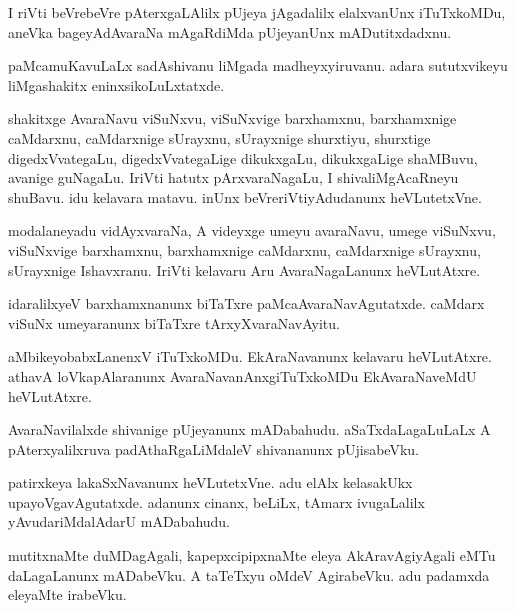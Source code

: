 \documentclass{article}
\begin{document}
\begin{mn}
I riVti  beVrebeVre  pAterxgaLAlilx  pUjeya  jAgadalilx  elalxvanUnx  iTuTxkoMDu,  aneVka  
bageyAdAvaraNa mAgaRdiMda  pUjeyanUnx  mADutitxdadxnu.
\end{mn}

\begin{mn}
paMcamuKavuLaLx  sadAshivanu  liMgada  madheyxyiruvanu.  adara sututxvikeyu  liMgashakitx  eninxsikoLuLxtatxde.
\end{mn}

\begin{mn}
shakitxge  AvaraNavu  viSuNxvu,  viSuNxvige  barxhamxnu,  barxhamxnige  caMdarxnu,  caMdarxnige  sUrayxnu,  
sUrayxnige  shurxtiyu,  shurxtige  digedxVvategaLu,  digedxVvategaLige  dikukxgaLu,  dikukxgaLige  shaMBuvu,  
avanige  guNagaLu.  IriVti  hatutx  pArxvaraNagaLu,  I  shivaliMgAcaRneyu  shuBavu.  idu  kelavara  matavu.  
inUnx  beVreriVtiyAdudanunx  heVLutetxVne.
\end{mn}

\begin{mn}
modalaneyadu  vidAyxvaraNa,  A  videyxge  umeyu  avaraNavu,  umege  viSuNxvu,  viSuNxvige  barxhamxnu, 
barxhamxnige  caMdarxnu,  caMdarxnige  sUrayxnu,  sUrayxnige  Ishavxranu.  IriVti  kelavaru  Aru  
AvaraNagaLanunx  heVLutAtxre.
\end{mn}

\begin{mn}
idaralilxyeV  barxhamxnanunx  biTaTxre  paMcaAvaraNavAgutatxde.  caMdarx  viSuNx  umeyaranunx  
biTaTxre  tArxyXvaraNavAyitu.
\end{mn}

\begin{mn}
aMbikeyobabxLanenxV  iTuTxkoMDu.  EkAraNavanunx  kelavaru  heVLutAtxre.  athavA  loVkapAlaranunx  
AvaraNavanAnxgiTuTxkoMDu  EkAvaraNaveMdU  heVLutAtxre.
\end{mn}

\begin{mn}
AvaraNavilalxde  shivanige  pUjeyanunx  mADabahudu.  aSaTxdaLagaLuLaLx  A  pAterxyalilxruva  
padAthaRgaLiMdaleV  shivananunx  pUjisabeVku.
\end{mn}

\begin{mn}
patirxkeya  lakaSxNavanunx  heVLutetxVne.  adu  elAlx  kelasakUkx  upayoVgavAgutatxde.  adanunx  
cinanx,  beLiLx,  tAmarx  ivugaLalilx  yAvudariMdalAdarU  mADabahudu.
\end{mn}

\begin{mn}
mutitxnaMte  duMDagAgali,  kapepxcipipxnaMte  eleya  AkAravAgiyAgali  eMTu  daLagaLanunx  mADabeVku.  
A  taTeTxyu  oMdeV  AgirabeVku.  adu  padamxda  eleyaMte  irabeVku.
\end{mn}
\end{document}
